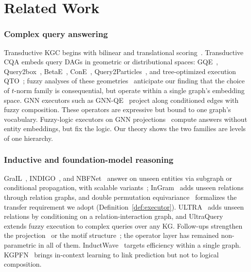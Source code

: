 \documentclass[journal]{IEEEtran}
\begin{document}
\section{Related Work}\label{sec:related}

\subsubsection{Complex query answering} Transductive KGC begins with bilinear and translational
scoring~\cite{bordes2013transE,sun2019rotate,trouillon2016complex,yang2015distmult,lacroix2018canonical}.
Transductive CQA embeds query DAGs in geometric or distributional spaces:
GQE~\cite{hamilton2018gqe}, Query2box~\cite{hamilton2018query2box},
BetaE~\cite{ren2020betae}, ConE~\cite{zhang2021cone},
Query2Particles~\cite{bai2022query2particles}, and tree-optimized
execution QTO~\cite{qto}; fuzzy analyses of these
geometries~\cite{van2023analyzing} anticipate our finding that the choice
of $t$-norm family is consequential, but operate within a single graph's
embedding space. GNN executors such as GNN-QE~\cite{gnnqe} project along
conditioned edges with fuzzy composition. These operators are expressive but bound to
one graph's vocabulary. Fuzzy-logic executors on GNN
projections~\cite{zhu2021nbfnet,graile} compute answers without entity
embeddings, but fix the logic. Our theory shows the two families are
levels of one hierarchy.

\subsubsection{Inductive and foundation-model reasoning}
GraIL~\cite{graile}, INDIGO~\cite{bai2023graile}, and
NBFNet~\cite{zhu2021nbfnet} answer on unseen entities via subgraph or
conditional propagation, with scalable variants~\cite{zhu2024scalable,feng2024astar};
InGram~\cite{lee2023ingram} adds unseen relations through relation
graphs, and double permutation
equivariance~\cite{zhou2023double} formalizes the transfer requirement we
adopt (Definition~\ref{def:executor}). ULTRA~\cite{galkin2024ultra} adds
unseen relations by conditioning on a relation-interaction graph, and
UltraQuery~\cite{galkin2024ultraquery} extends fuzzy execution to complex
queries over any KG. Follow-ups strengthen the
projection~\cite{zhang2025trix,arun2025semma} or the
motif structure~\cite{huang2025motif}; the operator layer has remained
non-parametric in all of them. InductWave~\cite{inductwave2026} targets
efficiency within a single graph. KGPFN~\cite{kgpfn2026} brings in-context
learning to link prediction but not to logical composition.
\end{document}
